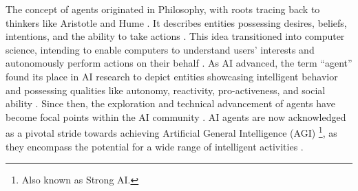\documentclass{article}
\begin{document}
The concept of agents originated in Philosophy, with roots tracing back to thinkers like Aristotle and Hume \cite{sep-agency}.
It describes entities possessing desires, beliefs, intentions, and the ability to take actions \cite{sep-agency}.
This idea transitioned into computer science, intending to enable computers to understand users' interests and autonomously perform actions on their behalf \cite{DBLP:phd/us/Agha85,green1997software,DBLP:journals/cacm/GeneserethK94}. 
As AI advanced, the term ``agent'' found its place in AI research to depict entities showcasing intelligent behavior and possessing qualities like autonomy, reactivity, pro-activeness, and social ability \cite{DBLP:journals/ker/WooldridgeJ95,DBLP:journals/logcom/Goodwin95}.
Since then, the exploration and technical advancement of agents have become focal points within the AI community \cite{russell2010artificial,padgham2005developing}. AI agents are now acknowledged as a pivotal stride towards achieving Artificial General Intelligence (AGI) \footnote{Also known as Strong AI.}, as they encompass the potential for a wide range of intelligent activities \cite{DBLP:journals/ker/WooldridgeJ95,DBLP:conf/law/Shoham92,hutter2004universal}. 
\end{document}
